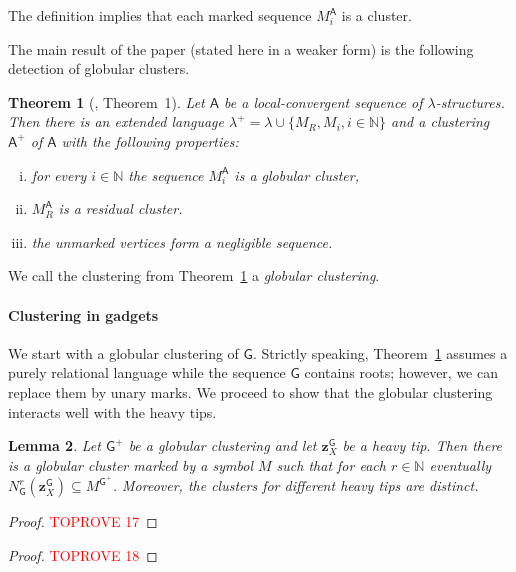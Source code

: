 \documentclass[11pt]{article}
\theoremstyle{plain}
\newtheorem{theorem}{Theorem}[section]
\newtheorem{lemma}[theorem]{Lemma}
\theoremstyle{definition}
\theoremstyle{remark}
\newcommand{\N}{\mathbb{N}}
\newcommand{\strseq}[1]{{\boldsymbol{\mathsf{#1}}}}
\newcommand{\tpl}[1]{{\bm{#1}}}
\begin{document}
The definition implies that each marked sequence $M_i^\strseq{A}$ is a cluster.

The main result of the paper (stated here in a weaker form) is the following detection of globular clusters.

\begin{theorem}[\cite{clustering}, Theorem~1]\label{thm:clustering}
    Let $\strseq{A}$ be a local-convergent sequence of $\lambda$-structures.
    Then there is an extended language $\lambda^+ = \lambda \cup \{M_R, M_i, i \in \N\}$ and a clustering $\strseq{A}^+$ of $\strseq{A}$ with the following properties:
    \begin{enumerate}[(i)]
        \item for every $i \in \N$ the sequence $M_i^{\strseq{A}}$ is a globular cluster,
        \item $M_R^{\strseq{A}}$ is a residual cluster.
        \item the unmarked vertices form a negligible sequence.
    \end{enumerate}
\end{theorem}

We call the clustering from Theorem~\ref{thm:clustering} a \emph{globular clustering}.

\paragraph{Clustering in gadgets}\label{par:clusteting_in_gadgets}

We start with a globular clustering of $\strseq{G}$.
Strictly speaking, Theorem~\ref{thm:clustering} assumes a purely relational language while the sequence $\strseq{G}$ contains roots; however, we can replace them by unary marks.
We proceed to show that the globular clustering interacts well with the heavy tips.

\begin{lemma}\label{lem:default_clustering_of_gadgets}
    Let $\strseq{G}^+$ be a globular clustering and let $\tpl{z}^\strseq{G}_X$ be a heavy tip.
    Then there is a globular cluster marked by a symbol $M$ such that for each $r \in \N$ eventually $N_\strseq{G}^r(\tpl{z}^\strseq{G}_X) \subseteq M^{\strseq{G}^+}$.
    Moreover, the clusters for different heavy tips are distinct.
\end{lemma}
\begin{proof}\textcolor{red}{TOPROVE 17}\end{proof}

\begin{proof}\textcolor{red}{TOPROVE 18}\end{proof}
\end{document}
